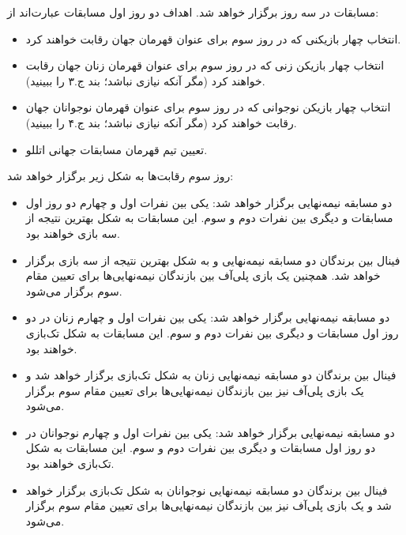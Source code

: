 


مسابقات در سه روز برگزار خواهد شد. اهداف دو روز اول مسابقات عبارت‌اند از:

\begin{itemize}
  \item انتخاب چهار بازیکنی که در روز سوم برای عنوان قهرمان جهان رقابت خواهند کرد.
  \item انتخاب چهار بازیکن زنی که در روز سوم برای عنوان قهرمان زنان جهان رقابت خواهند کرد (مگر آنکه نیازی نباشد؛ بند ج.۳ را ببینید).
  \item انتخاب چهار بازیکن نوجوانی که در روز سوم برای عنوان قهرمان نوجوانان جهان رقابت خواهند کرد (مگر آنکه نیازی نباشد؛ بند ج.۴ را ببینید).
  \item تعیین تیم قهرمان مسابقات جهانی اتللو.
\end{itemize}

روز سوم رقابت‌ها به شکل زیر برگزار خواهد شد:


\begin{itemize}
  \item دو مسابقه نیمه‌نهایی برگزار خواهد شد: یکی بین نفرات اول و چهارم دو روز اول مسابقات و دیگری بین نفرات دوم و سوم. این مسابقات به شکل بهترین نتیجه از سه بازی خواهند بود.
  \item فینال بین برندگان دو مسابقه نیمه‌نهایی و به شکل بهترین نتیجه از سه بازی برگزار خواهد شد. همچنین یک بازی پلی‌آف بین بازندگان نیمه‌نهایی‌ها برای تعیین مقام سوم برگزار می‌شود.
\end{itemize}


\begin{itemize}
  \item دو مسابقه نیمه‌نهایی برگزار خواهد شد: یکی بین نفرات اول و چهارم زنان در دو روز اول مسابقات و دیگری بین نفرات دوم و سوم. این مسابقات به شکل تک‌بازی خواهند بود.
  \item فینال بین برندگان دو مسابقه نیمه‌نهایی زنان به شکل تک‌بازی برگزار خواهد شد و یک بازی پلی‌آف نیز بین بازندگان نیمه‌نهایی‌ها برای تعیین مقام سوم برگزار می‌شود.
\end{itemize}


\begin{itemize}
  \item دو مسابقه نیمه‌نهایی برگزار خواهد شد: یکی بین نفرات اول و چهارم نوجوانان در دو روز اول مسابقات و دیگری بین نفرات دوم و سوم. این مسابقات به شکل تک‌بازی خواهند بود.
  \item فینال بین برندگان دو مسابقه نیمه‌نهایی نوجوانان به شکل تک‌بازی برگزار خواهد شد و یک بازی پلی‌آف نیز بین بازندگان نیمه‌نهایی‌ها برای تعیین مقام سوم برگزار می‌شود.
\end{itemize}


